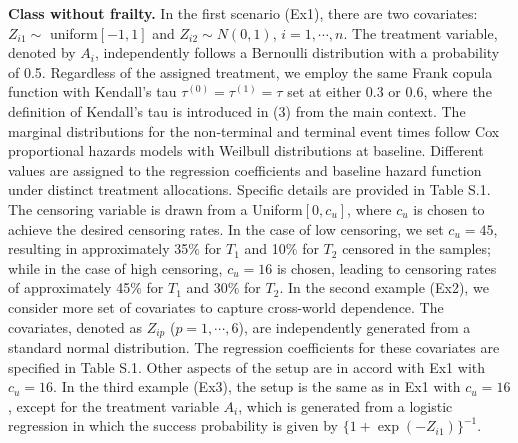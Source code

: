 \documentclass[12pt]{article}
\begin{document}

\textbf{Class without frailty.}
In the first scenario (Ex1), there are two covariates:  $Z_{i1}\sim$ uniform$[-1,1]$ and $Z_{i2}\sim N(0,1)$, $i=1,\cdots,n$. The treatment variable, denoted by $A_i$, independently follows a Bernoulli distribution with a probability of 0.5. Regardless of the assigned treatment, we employ the same Frank copula function with Kendall's tau $\tau^{(0)}=\tau^{(1)}=\tau$ set at either 0.3 or 0.6, where the definition of Kendall's tau is introduced in (3) from the main context. %
The marginal distributions for the non-terminal and terminal event times follow Cox proportional hazards models with Weilbull distributions at baseline. Different values are assigned to the regression coefficients and baseline hazard function under distinct treatment allocations. Specific details are provided in Table S.1. %
The censoring variable is drawn from a Uniform$[0, c_u]$, where $c_u$ is chosen to achieve the desired censoring rates. In the case of low censoring, we set $c_u=45$, resulting in approximately 35$\%$ for $T_1$ and 10$\%$ for $T_2$ censored in the samples; while in the case of high censoring, $c_u=16$ is chosen, leading to censoring rates of approximately 45$\%$ for $T_1$ and 30$\%$ for $T_2$. 
In the second example (Ex2), we consider more set of covariates to capture cross-world dependence. The covariates, denoted as $Z_{ip}$ ($p=1,\cdots,6$), are independently generated from a standard normal distribution. The regression coefficients for these covariates are specified in Table S.1. %
Other aspects of the setup are in accord with Ex1 with $c_u=16$. In the third example (Ex3), the setup is the same as in Ex1 with $c_u=16$, except for the treatment variable $A_i$, which is generated from a logistic regression in which the success probability is given by $\{1+\exp(-Z_{i1})\}^{-1}$. 
\end{document}

